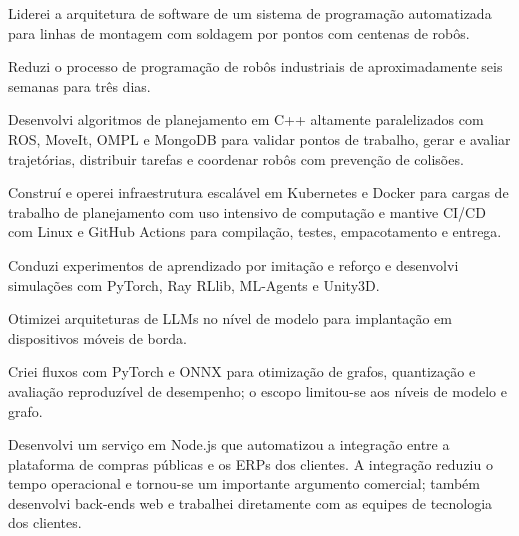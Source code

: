 \documentclass[10pt,a4paper]{article}
\begin{document}
\begin{cvbullets}
  \item Liderei a arquitetura de software de um sistema de programação automatizada para linhas de montagem com soldagem por pontos com centenas de robôs.
  \item Reduzi o processo de programação de robôs industriais de aproximadamente seis semanas para três dias.
  \item Desenvolvi algoritmos de planejamento em C++ altamente paralelizados com ROS, MoveIt, OMPL e MongoDB para validar pontos de trabalho, gerar e avaliar trajetórias, distribuir tarefas e coordenar robôs com prevenção de colisões.
  \item Construí e operei infraestrutura escalável em Kubernetes e Docker para cargas de trabalho de planejamento com uso intensivo de computação e mantive CI/CD com Linux e GitHub Actions para compilação, testes, empacotamento e entrega.
  \item Conduzi experimentos de aprendizado por imitação e reforço e desenvolvi simulações com PyTorch, Ray RLlib, ML-Agents e Unity3D.
  \item Otimizei arquiteturas de LLMs no nível de modelo para implantação em dispositivos móveis de borda.
  \item Criei fluxos com PyTorch e ONNX para otimização de grafos, quantização e avaliação reproduzível de desempenho; o escopo limitou-se aos níveis de modelo e grafo.
\end{cvbullets}

\begin{cvbullets}
  \item Desenvolvi um serviço em Node.js que automatizou a integração entre a plataforma de compras públicas e os ERPs dos clientes. A integração reduziu o tempo operacional e tornou-se um importante argumento comercial; também desenvolvi back-ends web e trabalhei diretamente com as equipes de tecnologia dos clientes.
\end{cvbullets}

\end{document}
